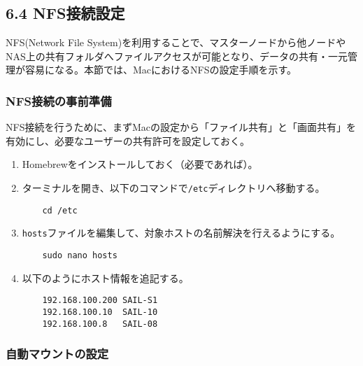 \subsection{6.4 NFS接続設定}

NFS(Network File System)を利用することで、マスターノードから他ノードやNAS上の共有フォルダへファイルアクセスが可能となり、データの共有・一元管理が容易になる。本節では、MacにおけるNFSの設定手順を示す。

\subsubsection*{NFS接続の事前準備}

NFS接続を行うために、まずMacの設定から「ファイル共有」と「画面共有」を有効にし、必要なユーザーの共有許可を設定しておく。

\begin{enumerate}
    \item Homebrewをインストールしておく（必要であれば）。
    \item ターミナルを開き、以下のコマンドで\texttt{/etc}ディレクトリへ移動する。
    \begin{verbatim}
    cd /etc
    \end{verbatim}
    \item \texttt{hosts}ファイルを編集して、対象ホストの名前解決を行えるようにする。
    \begin{verbatim}
    sudo nano hosts
    \end{verbatim}
    \item 以下のようにホスト情報を追記する。
    \begin{verbatim}
    192.168.100.200 SAIL-S1
    192.168.100.10  SAIL-10
    192.168.100.8   SAIL-08
    \end{verbatim}
\end{enumerate}

\subsubsection*{自動マウントの設定}

